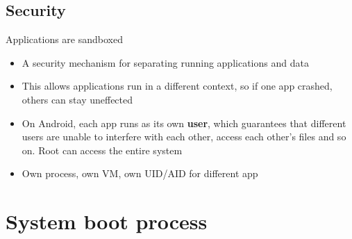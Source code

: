 \documentclass{article}
\begin{document}
\begin{multicols}{2}
\end{multicols}

\subsection{Security}

Applications are sandboxed
\begin{itemize}
 \item A security mechanism for separating running applications and data
 \item This allows applications run in a different context, so if one app crashed, others can stay uneffected
 \item On Android, each app runs as its own \textbf{user}, which guarantees that different users are unable to interfere with each other, access each other’s files and so on. Root can access the entire system
 \item Own process, own VM, own UID/AID for different app
\end{itemize}

\newpage

\section{System boot process}
\end{document}
